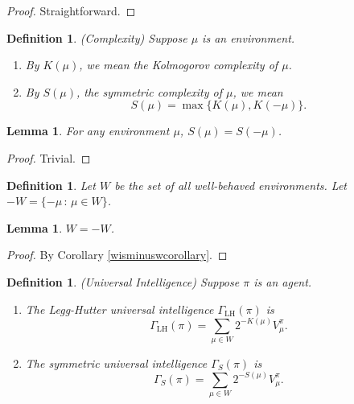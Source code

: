 \documentclass{article}
\newtheorem{definition}[theorem]{Definition}
\newtheorem{lemma}[theorem]{Lemma}
\def\LH{\textrm{LH}}
\def\SYM{S}
\begin{document}
\begin{proof}
    Straightforward.
\end{proof}

\begin{definition}
\label{complexitydefn}
(Complexity)
    Suppose $\mu$ is an environment.
    \begin{enumerate}
        \item By $K(\mu)$, we mean the Kolmogorov complexity of $\mu$.
        \item By $S(\mu)$, the \emph{symmetric complexity} of $\mu$,
        we mean
        \[
            S(\mu) = \max\{K(\mu), K(-\mu)\}.
        \]
    \end{enumerate}
\end{definition}

\begin{lemma}
\label{Sissymmetriclemma}
    For any environment $\mu$, $S(\mu) = S(-\mu)$.
\end{lemma}

\begin{proof}
    Trivial.
\end{proof}

\begin{definition}
    Let $W$ be the set of all well-behaved environments.
    Let $-W=\{-\mu\,:\,\mu\in W\}$.
\end{definition}

\begin{lemma}
\label{WequalsminusWlemma}
$W=-W$.
\end{lemma}

\begin{proof}
    By Corollary \ref{wisminuswcorollary}.
\end{proof}

\begin{definition}
\label{universalintelligencedefn}
(Universal Intelligence)
    Suppose $\pi$ is an agent.
    \begin{enumerate}
        \item
        The \emph{Legg-Hutter universal intelligence} $\Gamma_{\LH}(\pi)$ is
        \[
            \Gamma_{\LH}(\pi) = \sum_{\mu \in W} 2^{-K(\mu)}V^\pi_\mu.
        \]
        \item
        The \emph{symmetric universal intelligence} $\Gamma_{\SYM}(\pi)$ is
        \[
            \Gamma_{\SYM}(\pi) = \sum_{\mu\in W} 2^{-S(\mu)}V^\pi_\mu.
        \]
    \end{enumerate}
\end{definition}
\end{document}
